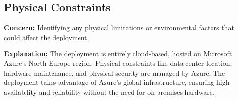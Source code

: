 \documentclass[a4paper,12pt]{article}
\begin{document}
\subsection{Physical Constraints}
\textbf{Concern:} Identifying any physical limitations or environmental factors that could affect the deployment.

\textbf{Explanation:} The deployment is entirely cloud-based, hosted on Microsoft Azure's North Europe region. Physical constraints like data center location, hardware maintenance, and physical security are managed by Azure. The deployment takes advantage of Azure's global infrastructure, ensuring high availability and reliability without the need for on-premises hardware.






\listoffigures
\end{document}

